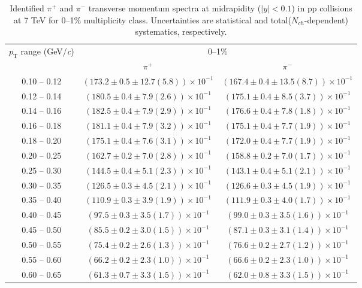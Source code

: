 \begin{table}
\caption{Identified $\pi^{+}$ and $\pi^{-}$  transverse momentum spectra at midrapidity ($|y|<0.1$) in pp collisions at 7 TeV for 0--1\% multiplicity class. Uncertainties are statistical and total($N_{ch}$-dependent) systematics, respectively.}
\label{tab:PionPlus_PionMinus_0to1}
\begin{center}
\begin{tabular}{ c | c c }
\hline
\multirow{2}{*}{$p_{\mathrm{T}}$ range (GeV/\textit{c})} & \multicolumn{2}{c}{0--1\%} \\ & $\pi^{+}$& $\pi^{-}$\\ 
\hline
0.10 -- 0.12 & $(173.2\pm0.5\pm12.7(5.8))\times10^{-1}$ & $(167.4\pm0.4\pm13.5(8.7))\times10^{-1}$ \\ 
0.12 -- 0.14 & $(180.5\pm0.4\pm7.9(2.6))\times10^{-1}$ & $(175.1\pm0.4\pm8.5(3.7))\times10^{-1}$ \\ 
0.14 -- 0.16 & $(182.5\pm0.4\pm7.9(2.9))\times10^{-1}$ & $(176.6\pm0.4\pm7.8(1.8))\times10^{-1}$ \\ 
0.16 -- 0.18 & $(181.1\pm0.4\pm7.9(3.2))\times10^{-1}$ & $(175.1\pm0.4\pm7.7(1.9))\times10^{-1}$ \\ 
0.18 -- 0.20 & $(175.1\pm0.4\pm7.6(3.1))\times10^{-1}$ & $(172.0\pm0.4\pm7.7(1.9))\times10^{-1}$ \\ 
0.20 -- 0.25 & $(162.7\pm0.2\pm7.0(2.8))\times10^{-1}$ & $(158.8\pm0.2\pm7.0(1.7))\times10^{-1}$ \\ 
0.25 -- 0.30 & $(144.5\pm0.4\pm5.1(2.3))\times10^{-1}$ & $(143.1\pm0.4\pm5.1(2.1))\times10^{-1}$ \\ 
0.30 -- 0.35 & $(126.5\pm0.3\pm4.5(2.1))\times10^{-1}$ & $(126.6\pm0.3\pm4.5(1.9))\times10^{-1}$ \\ 
0.35 -- 0.40 & $(110.9\pm0.3\pm3.9(1.9))\times10^{-1}$ & $(111.9\pm0.3\pm4.0(1.7))\times10^{-1}$ \\ 
0.40 -- 0.45 & $(97.5\pm0.3\pm3.5(1.7))\times10^{-1}$ & $(99.0\pm0.3\pm3.5(1.6))\times10^{-1}$ \\ 
0.45 -- 0.50 & $(85.5\pm0.2\pm3.0(1.5))\times10^{-1}$ & $(87.1\pm0.3\pm3.1(1.4))\times10^{-1}$ \\ 
0.50 -- 0.55 & $(75.4\pm0.2\pm2.6(1.3))\times10^{-1}$ & $(76.6\pm0.2\pm2.7(1.2))\times10^{-1}$ \\ 
0.55 -- 0.60 & $(66.2\pm0.2\pm2.3(1.0))\times10^{-1}$ & $(66.6\pm0.2\pm2.3(1.0))\times10^{-1}$ \\ 
0.60 -- 0.65 & $(61.3\pm0.7\pm3.3(1.5))\times10^{-1}$ & $(62.0\pm0.8\pm3.3(1.5))\times10^{-1}$ \\ 

\end{tabular}
\end{center}
\end{table}
